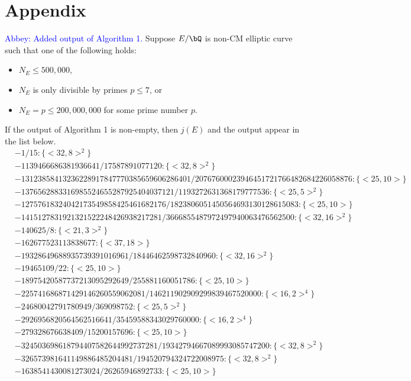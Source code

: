 \documentclass[11pt,reqno]{amsart}
\theoremstyle{plain}
\theoremstyle{definition}
\newcommand{\Q}{\bQ}
\newcommand{\abbey}[1]{\textcolor{blue}{Abbey: #1}}
\begin{document}
\section*{Appendix}
\label{appendix}
\abbey{Added output of Algorithm 1.}
Suppose $E/\Q$ is non-CM elliptic curve such that one of the following holds:
\begin{itemize}
    \item$N_E \leq 500{,}000$,
    \item $N_E$ is only divisible by primes $p \leq 7$, or
    \item $N_E=p \leq 200{,}000{,}000$ for some prime number $p$.
\end{itemize}
If the output of Algorithm 1 is non-empty, then $j(E)$ and the output appear in the list below.
\scriptsize{
\begin{align*}
&-1/15:\{<32, 8>^2\}\\
&-1139466686381936641/17587891077120:\{<32, 8>^2 \}\\
&-13123858413236228917847770385659606286401/20767600023946451721766482684226058876:\{ <25, 10> \}\\
&-1376562883316985524655287925404037121/1193272631368179777536:\{ <25, 5>^2 \}\\
&-12757618324042173549858425461682176/1823806051450564693130128615083:\{ <25, 10> \}\\
&-1415127831921321522248426938217281/3666855487972497940063476562500:\{ <32, 16>^2 \}\\
&-140625/8:\{ <21, 3>^2 \}\\
&-162677523113838677:\{ <37, 18> \}\\
&-19328649688935739391016961/18446462598732840960:\{ <32, 16>^2 \}\\
&-19465109/22:\{ <25, 10> \}\\
&-18975420587737213095292649/255881160051786:\{<25, 10> \}\\
&-225741686871429146260559062081/146211902909299839467520000:\{ <16, 2>^4 \}\\
&-24680042791780949/369098752:\{ <25, 5>^2 \}\\
&-2926956820564562516641/35459588343029760000:\{ <16, 2>^4 \}\\
&-279328676638409/15200157696:\{ <25, 10> \}\\
&-324503698618794407582644992737281/19342794667089993085747200:\{ <32, 8>^2 \}\\
&-326573981641149886485204481/194520794324722008975:\{ <32, 8>^2 \}\\
&-1638541430081273024/26265946892733:\{ <25, 10> \}\\

\end{align*}}
\end{document}
